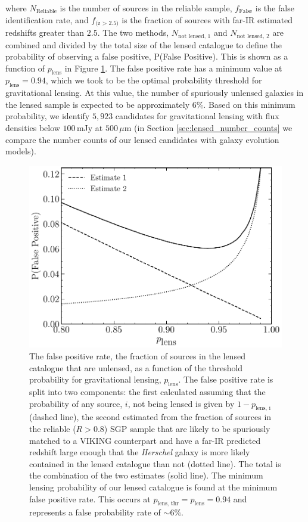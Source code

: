 \noindent where $N_{\textrm{Reliable}}$ is the number of sources in the reliable sample, $f_{\textrm{False}}$ is the false identification rate, and $f_{\textrm{(z > 2.5)}}$ is the fraction of sources with far-IR estimated redshifts greater than $2.5$. The two methods, $N_{\textrm{not lensed, 1}}$ and $N_{\textrm{not lensed, 2}}$ are combined and divided by the total size of the lensed catalogue to define the probability of observing a false positive, P(False Positive). This is shown as a function of $p_{\textrm{lens}}$ in Figure \ref{fig:lens_false_positive}. The false positive rate has a minimum value at $p_\textrm{lens} = 0.94$, which we took to be the optimal probability threshold for gravitational lensing. At this value, the number of spuriously unlensed galaxies in the lensed sample is expected to be approximately $6\%$. Based on this minimum probability, we identify $5,923$ candidates for gravitational lensing with flux densities below $100\,$mJy at $500\,\mu$m (in Section \ref{sec:lensed_number_counts} we compare the number counts of our lensed candidates with galaxy evolution models).

\begin{figure}
    \centering
    \includegraphics[width=0.8\columnwidth]{Figures/Figure_2_11.pdf}
    \caption[Fraction of unlensed sources in our lensed sample as a function of $p_\textrm{lens}$]{The false positive rate, the fraction of sources in the lensed catalogue that are unlensed, as a function of the threshold probability for gravitational lensing, $p_\textrm{lens}$. The false positive rate is split into two components: the first calculated assuming that the probability of any source, $i$, not being lensed is given by $1 - p_{\textrm{lens, i}}$ (dashed line), the second estimated from the fraction of sources in the reliable ($R > 0.8$) SGP sample that are likely to be spuriously matched to a VIKING counterpart and have a far-IR predicted redshift large enough that the \textit{Herschel} galaxy is more likely contained in the lensed catalogue than not (dotted line). The total is the combination of the two estimates (solid line). The minimum lensing probability of our lensed catalogue is found at the minimum false positive rate. This occurs at $p_\textrm{lens, thr} = p_\textrm{lens} = 0.94$ and represents a false probability rate of $\sim 6\%$.}
    \label{fig:lens_false_positive}
\end{figure}

